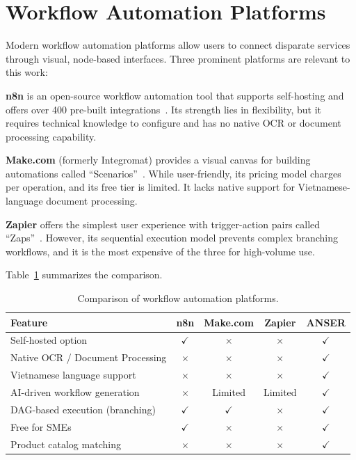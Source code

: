 \documentclass[11pt,a4paper]{report}
\begin{document}
\section{Workflow Automation Platforms}

Modern workflow automation platforms allow users to connect disparate services through visual, node-based interfaces. Three prominent platforms are relevant to this work:

\textbf{n8n} is an open-source workflow automation tool that supports self-hosting and offers over 400 pre-built integrations~\cite{n8n}. Its strength lies in flexibility, but it requires technical knowledge to configure and has no native OCR or document processing capability.

\textbf{Make.com} (formerly Integromat) provides a visual canvas for building automations called ``Scenarios''~\cite{makecom}. While user-friendly, its pricing model charges per operation, and its free tier is limited. It lacks native support for Vietnamese-language document processing.

\textbf{Zapier} offers the simplest user experience with trigger-action pairs called ``Zaps''~\cite{zapier}. However, its sequential execution model prevents complex branching workflows, and it is the most expensive of the three for high-volume use.

Table~\ref{tab:platform-comparison} summarizes the comparison.

\begin{table}[H]
\centering
\caption{Comparison of workflow automation platforms.}
\label{tab:platform-comparison}
\small
\begin{tabular}{lcccc}
\toprule
\textbf{Feature} & \textbf{n8n} & \textbf{Make.com} & \textbf{Zapier} & \textbf{ANSER} \\
\midrule
Self-hosted option                  & $\checkmark$ & $\times$ & $\times$ & $\checkmark$ \\
Native OCR / Document Processing    & $\times$     & $\times$ & $\times$ & $\checkmark$ \\
Vietnamese language support         & $\times$     & $\times$ & $\times$ & $\checkmark$ \\
AI-driven workflow generation       & $\times$     & Limited  & Limited  & $\checkmark$ \\
DAG-based execution (branching)     & $\checkmark$ & $\checkmark$ & $\times$ & $\checkmark$ \\
Free for SMEs                       & $\checkmark$ & $\times$ & $\times$ & $\checkmark$ \\
Product catalog matching            & $\times$     & $\times$ & $\times$ & $\checkmark$ \\
\bottomrule
\end{tabular}
\end{table}
\end{document}
